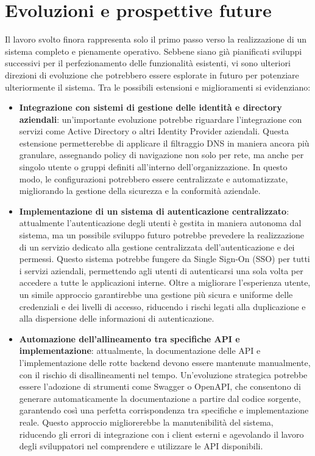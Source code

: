 \section{Evoluzioni e prospettive future}
Il lavoro svolto finora rappresenta solo il primo passo verso la realizzazione di un sistema completo e pienamente operativo. Sebbene siano già pianificati sviluppi successivi per il perfezionamento delle funzionalità esistenti, vi sono ulteriori direzioni di evoluzione che potrebbero essere esplorate in futuro per potenziare ulteriormente il sistema. Tra le possibili estensioni e miglioramenti si evidenziano:

\begin{itemize}
  \item \textbf{Integrazione con sistemi di gestione delle identità e directory aziendali}: un'importante evoluzione potrebbe riguardare l'integrazione con servizi come Active Directory o altri Identity Provider aziendali. Questa estensione permetterebbe di applicare il filtraggio DNS in maniera ancora più granulare, assegnando policy di navigazione non solo per rete, ma anche per singolo utente o gruppi definiti all’interno dell’organizzazione. In questo modo, le configurazioni potrebbero essere centralizzate e automatizzate, migliorando la gestione della sicurezza e la conformità aziendale.

  \item \textbf{Implementazione di un sistema di autenticazione centralizzato}: attualmente l’autenticazione degli utenti è gestita in maniera autonoma dal sistema, ma un possibile sviluppo futuro potrebbe prevedere la realizzazione di un servizio dedicato alla gestione centralizzata dell'autenticazione e dei permessi. Questo sistema potrebbe fungere da Single Sign-On (SSO) per tutti i servizi aziendali, permettendo agli utenti di autenticarsi una sola volta per accedere a tutte le applicazioni interne. Oltre a migliorare l’esperienza utente, un simile approccio garantirebbe una gestione più sicura e uniforme delle credenziali e dei livelli di accesso, riducendo i rischi legati alla duplicazione e alla dispersione delle informazioni di autenticazione.

  \item \textbf{Automazione dell’allineamento tra specifiche API e implementazione}: attualmente, la documentazione delle API e l’implementazione delle rotte backend devono essere mantenute manualmente, con il rischio di disallineamenti nel tempo. Un'evoluzione strategica potrebbe essere l'adozione di strumenti come Swagger o OpenAPI, che consentono di generare automaticamente la documentazione a partire dal codice sorgente, garantendo così una perfetta corrispondenza tra specifiche e implementazione reale. Questo approccio migliorerebbe la manutenibilità del sistema, riducendo gli errori di integrazione con i client esterni e agevolando il lavoro degli sviluppatori nel comprendere e utilizzare le API disponibili.
\end{itemize}

